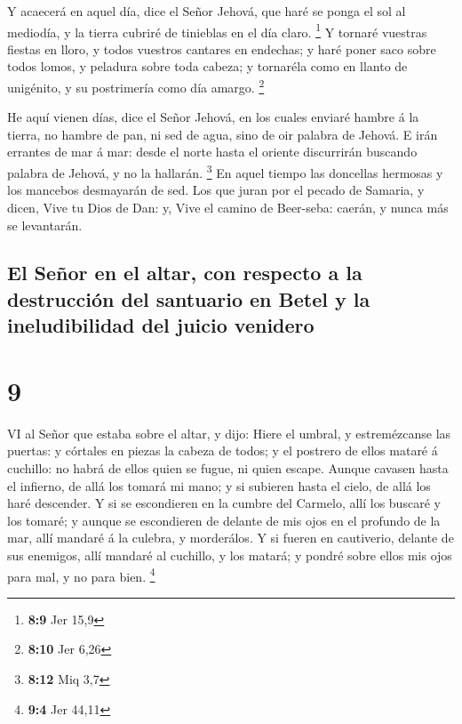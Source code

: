  Y acaecerá en aquel día, dice el Señor Jehová, que haré se
ponga el sol al mediodía, y la tierra cubriré de tinieblas en el día
claro. \footnote{\textbf{8:9} Jer 15,9}  Y tornaré vuestras
fiestas en lloro, y todos vuestros cantares en endechas; y haré poner
saco sobre todos lomos, y peladura sobre toda cabeza; y tornaréla como
en llanto de unigénito, y su postrimería como día amargo. \footnote{\textbf{8:10}
  Jer 6,26}

 He aquí vienen días, dice el Señor Jehová, en los cuales
enviaré hambre á la tierra, no hambre de pan, ni sed de agua, sino de
oir palabra de Jehová.  E irán errantes de mar á mar: desde
el norte hasta el oriente discurrirán buscando palabra de Jehová, y no
la hallarán. \footnote{\textbf{8:12} Miq 3,7}  En aquel
tiempo las doncellas hermosas y los mancebos desmayarán de sed.
 Los que juran por el pecado de Samaria, y dicen, Vive tu
Dios de Dan: y, Vive el camino de Beer-seba: caerán, y nunca más se
levantarán.

\hypertarget{el-seuxf1or-en-el-altar-con-respecto-a-la-destrucciuxf3n-del-santuario-en-betel-y-la-ineludibilidad-del-juicio-venidero}{%
\subsection{El Señor en el altar, con respecto a la destrucción del
santuario en Betel y la ineludibilidad del juicio
venidero}\label{el-seuxf1or-en-el-altar-con-respecto-a-la-destrucciuxf3n-del-santuario-en-betel-y-la-ineludibilidad-del-juicio-venidero}}

\hypertarget{section-8}{%
\section{9}\label{section-8}}

 VI al Señor que estaba sobre el altar, y dijo: Hiere el
umbral, y estremézcanse las puertas: y córtales en piezas la cabeza de
todos; y el postrero de ellos mataré á cuchillo: no habrá de ellos quien
se fugue, ni quien escape.  Aunque cavasen hasta el
infierno, de allá los tomará mi mano; y si subieren hasta el cielo, de
allá los haré descender.  Y si se escondieren en la cumbre
del Carmelo, allí los buscaré y los tomaré; y aunque se escondieren de
delante de mis ojos en el profundo de la mar, allí mandaré á la culebra,
y morderálos.  Y si fueren en cautiverio, delante de sus
enemigos, allí mandaré al cuchillo, y los matará; y pondré sobre ellos
mis ojos para mal, y no para bien. \footnote{\textbf{9:4} Jer 44,11}

